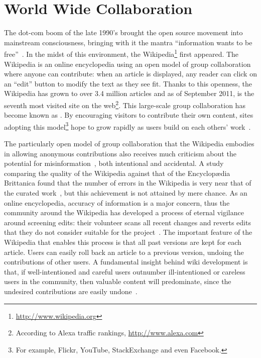 \section{World Wide Collaboration}

The dot-com boom of the late 1990's brought the open source movement into
mainstream consciousness, bringing with it the mantra ``information
wants to be free''~\cite{wiki:Information-free}.
In the midst of this environment, the
Wikipedia\footnote{\url{http://www.wikipedia.org}}
first appeared.
The Wikipedia
is an online encyclopedia using an open model of group collaboration
where anyone can contribute: when an article is
displayed, any reader can click on an ``edit'' button to modify
the text as they see fit.
Thanks to this openness, the Wikipedia has grown to
over 3.4 million articles and as of September 2011,
is the seventh most visited site on the
web\footnote{According to Alexa traffic rankings, \url{http://www.alexa.com}}.
This large-scale group collaboration
has become known as .
By encouraging visitors to contribute their own content,
sites adopting this model\footnote{For example,
Flickr, YouTube, StackExchange and even Facebook.}
hope to grow rapidly as users build on each others' work~\cite{Taylor2007}.



The particularly open model of group collaboration that the Wikipedia embodies
in allowing anonymous contributions
also receives much criticism about the potential for
misinformation~\cite{Seigenthaler05,NewYorkTimes05a,Lehmann2006,NewZelandHerald06,Davis2006,Stross2006,Schiff2006,BBC2007},
both intentional and accidental.
A study comparing the quality of the Wikipedia against that
of the Encyclop{\ae}dia Brittanica found that the number of errors
in the Wikipedia is very near that of the curated work~\cite{Giles2005},
but this achievement is not attained by mere chance.
As an online encyclopedia, accuracy of information is a major concern,
thus the community around the Wikipedia has developed a process
of eternal vigilance around screening edits: their volunteer  scans all recent changes and reverts edits that they do not
consider suitable for the project~\cite{wiki:RCPatrol}.
The important feature of the Wikipedia that enables this
process is that all past versions are kept for each article.
Users can easily roll back an article to a previous version,
undoing the contributions of other users.
A fundamental insight behind wiki development is that,
if well-intentioned and careful users outnumber ill-intentioned
or careless users in the community, then valuable content will predominate,
since the undesired contributions are easily undone~\cite{Leuf2001}.


